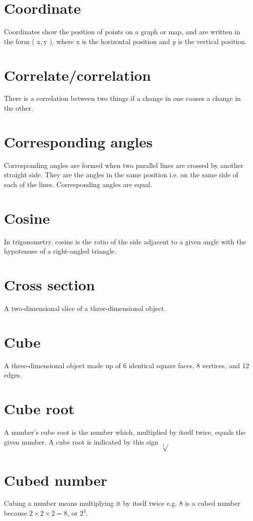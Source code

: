 \documentclass[10pt]{article}
\begin{document}
\section*{Coordinate}
Coordinates show the position of points on a graph or map, and are written in the form ( $\mathrm{x}, \mathrm{y}$ ), where x is the horizontal position and $y$ is the vertical position.

\section*{Correlate/correlation}
There is a correlation between two things if a change in one causes a change in the other.

\section*{Corresponding angles}
Corresponding angles are formed when two parallel lines are crossed by another straight side. They are the angles in the same position i.e. on the same side of each of the lines. Corresponding angles are equal.

\section*{Cosine}
In trigonometry, cosine is the ratio of the side adjacent to a given angle with the hypotenuse of a right-angled triangle.

\section*{Cross section}
A two-dimensional slice of a three-dimensional object.

\section*{Cube}
A three-dimensional object made up of 6 identical square faces, 8 vertices, and 12 edges.

\section*{Cube root}
A number's cube root is the number which, multiplied by itself twice, equals the given number. A cube root is indicated by this sign $\sqrt[3]{ }$

\section*{Cubed number}
Cubing a number means multiplying it by itself twice e.g. 8 is a cubed number because $2 \times 2 \times 2=8$, or $2^{3}$.
\end{document}
